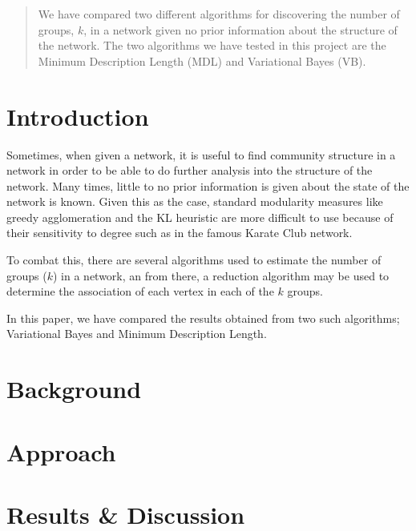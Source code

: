 \documentclass[twocolumn,twoside]{IEEEtran}
\author{Brett Israelsen & Joshua Rahm}
\begin{document}
\maketitle

\begin{abstract}
We have compared two different algorithms for discovering
the number of groups, $k$, in a network given no prior information about the
structure of the network. The two algorithms we have tested in this project are
the Minimum Description Length (MDL) and Variational Bayes (VB).
\end{abstract}

\section*{Introduction}

Sometimes, when given a network, it is useful to find community structure in a
network in order to be able to do further analysis into the structure of the
network. Many times, little to no prior information is given about the state of
the network is known. Given this as the case, standard modularity measures like
greedy agglomeration and the KL heuristic are more difficult to use because of their
sensitivity to degree such as in the famous Karate Club network.

To combat this, there are several algorithms used to estimate the number of groups ($k$)
in a network, an from there, a reduction algorithm may be used to determine the association
of each vertex in each of the $k$ groups.

In this paper, we have compared the results obtained from two such algorithms;
Variational Bayes and Minimum Description Length.

\section*{Background}


\section*{Approach}

\section*{Results \& Discussion}



%
% 
%
%
%   
\end{document}
